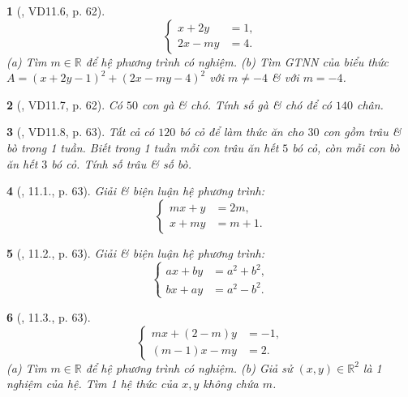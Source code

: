 \documentclass{article}
\newtheorem{baitoan}{}
\begin{document}
\begin{baitoan}[\cite{TLCT_THCS_Toan_9_dai_so}, VD11.6, p. 62]
	\begin{equation*}
		\left\{\begin{split}
			x + 2y &= 1,\\
			2x - my &= 4.
		\end{split}\right.
	\end{equation*}
	(a) Tìm $m\in\mathbb{R}$ để hệ phương trình có nghiệm. (b) Tìm {\rm GTNN} của biểu thức $A = (x + 2y - 1)^2 + (2x - my - 4)^2$ với $m\ne-4$ \& với $m = -4$.
\end{baitoan}

\begin{baitoan}[\cite{TLCT_THCS_Toan_9_dai_so}, VD11.7, p. 62]
	Có $50$ con gà \& chó. Tính số gà \& chó để có $140$ chân.
\end{baitoan}

\begin{baitoan}[\cite{TLCT_THCS_Toan_9_dai_so}, VD11.8, p. 63]
	Tất cả có $120$ bó cỏ để làm thức ăn cho $30$ con gồm trâu \& bò trong 1 tuần. Biết trong 1 tuần mỗi con trâu ăn hết $5$ bó cỏ, còn mỗi con bò ăn hết $3$ bó cỏ. Tính số trâu \& số bò.
\end{baitoan}

\begin{baitoan}[\cite{TLCT_THCS_Toan_9_dai_so}, 11.1., p. 63]
	Giải \& biện luận hệ phương trình:
	\begin{equation*}
		\left\{\begin{split}
			mx + y &= 2m,\\
			x + my &= m + 1.
		\end{split}\right.
	\end{equation*}
\end{baitoan}

\begin{baitoan}[\cite{TLCT_THCS_Toan_9_dai_so}, 11.2., p. 63]
	Giải \& biện luận hệ phương trình:
	\begin{equation*}
		\left\{\begin{split}
			ax + by &= a^2 + b^2,\\
			bx + ay &= a^2 - b^2.
		\end{split}\right.
	\end{equation*}
\end{baitoan}

\begin{baitoan}[\cite{TLCT_THCS_Toan_9_dai_so}, 11.3., p. 63]
	\begin{equation*}
		\left\{\begin{split}
			mx + (2 - m)y &= -1,\\
			(m - 1)x - my &= 2.
		\end{split}\right.
	\end{equation*}
	(a) Tìm $m\in\mathbb{R}$ để hệ phương trình có nghiệm. (b) Giả sử $(x,y)\in\mathbb{R}^2$ là 1 nghiệm của hệ. Tìm 1 hệ thức của $x,y$ không chứa $m$.
\end{baitoan}
\end{document}
